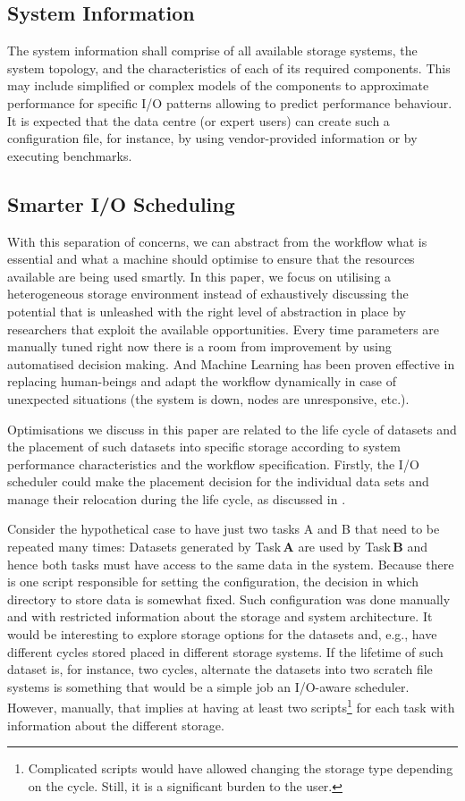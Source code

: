 \documentclass[a4paper]{article}
\begin{document}
\subsection{System Information}

The system information shall comprise of all available storage systems, the system topology, and the characteristics of each of its required components.
This may include simplified or complex models of the components to approximate performance for specific I/O patterns allowing to predict performance behaviour.
It is expected that the data centre (or expert users) can create such a configuration file, for instance, by using vendor-provided information or by executing benchmarks.

\subsection{Smarter I/O Scheduling}

With this separation of concerns, we can abstract from the workflow what is essential and what a machine should optimise to ensure that the resources available are being used smartly.
In this paper, we focus on utilising a heterogeneous storage environment instead of exhaustively discussing the potential that is unleashed with the right level of abstraction in place by researchers that exploit the available opportunities.
Every time parameters are manually tuned right now there is a room from improvement by using automatised decision making.
And Machine Learning has been proven effective in replacing human-beings and adapt the workflow dynamically in case of unexpected situations (the system is down, nodes are unresponsive, etc.).

Optimisations we discuss in this paper are related to the life cycle of datasets and the placement of such datasets into specific storage according to system performance characteristics and the workflow specification.
Firstly, the I/O scheduler could make the placement decision for the individual data sets and manage their relocation during the life cycle, as discussed in .

Consider the hypothetical case to have just two tasks A and B that need to be repeated many times:
Datasets generated by Task\,\textbf{A} are used by Task\,\textbf{B} and hence both tasks must have access to the same data in the system.
Because there is one script responsible for setting the configuration, the decision in which directory to store data is somewhat fixed.
Such configuration was done manually and with restricted information about the storage and system architecture.
It would be interesting to explore storage options for the datasets and, e.g., have different cycles stored placed in different storage systems.
If the lifetime of such dataset is, for instance, two cycles, alternate the datasets into two scratch file systems is something that would be a simple job an I/O-aware scheduler.
However, manually, that implies at having at least two scripts\footnote{Complicated scripts would have allowed changing the storage type depending on the cycle. Still, it is a significant burden to the user.} for each task with information about the different storage.
\end{document}
